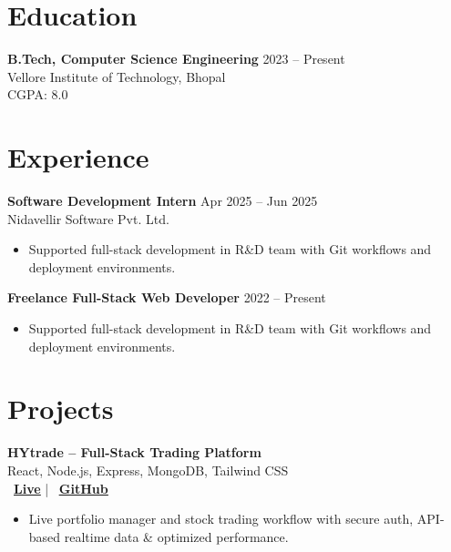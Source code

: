 \documentclass[a4paper,11pt]{article}
\begin{document}

\section*{Education}

\textbf{B.Tech, Computer Science Engineering} \hfill 2023 -- Present \\
Vellore Institute of Technology, Bhopal \\
CGPA: 8.0


\section*{Experience}

\textbf{Software Development Intern} \hfill Apr 2025 -- Jun 2025 \\
Nidavellir Software Pvt. Ltd.
\begin{itemize}
    \item Supported full-stack development in R\&D team with Git workflows and deployment environments.
\end{itemize}

\textbf{Freelance Full-Stack Web Developer} \hfill 2022 -- Present
\begin{itemize}
    \item Supported full-stack development in R\&D team with Git workflows and deployment environments.
\end{itemize}


\section*{Projects}

\textbf{HYtrade – Full-Stack Trading Platform} \\
React, Node.js, Express, MongoDB, Tailwind CSS \\
\,
\href{https://www.hytrade.in/}{\underline{\textbf{Live}}}
\quad | \quad 
\faGithub\,
\href{https://github.com/Satendra-Soraiya/hytrade-4}{\underline{\textbf{GitHub}}}
\begin{itemize}
    \item Live portfolio manager and stock trading workflow with secure auth, API-based realtime data \& optimized performance.
\end{itemize}
\end{document}
